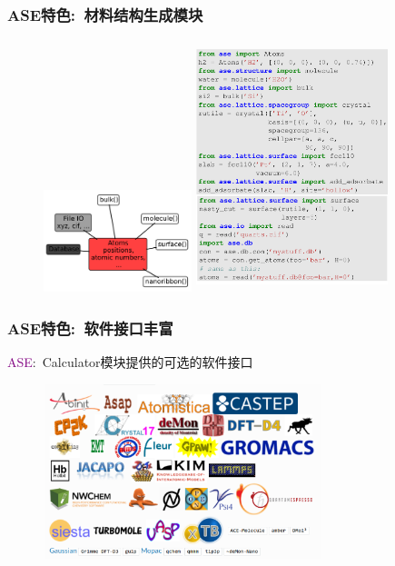 \frame
{
\frametitle{\textrm{ASE}特色:~材料结构生成模块}
\begin{figure}[h!]
\centering
\vspace*{-0.15in}
\includegraphics[height=1.2in,width=1.7in,viewport=0 0 820 530,clip]{Figures/ASE_atoms_module.png}
\includegraphics[height=2.9in,width=2.2in,viewport=0 0 970 1200,clip]{Figures/ASE_atoms_module-examples.png}
\label{Logo_atoms-module}
\end{figure} 
}

\frame
{
\frametitle{\textrm{ASE}特色:~软件接口丰富}
\textcolor{purple}{\textrm{ASE}}:~\textrm{Calculator}模块提供的可选的软件接口
\begin{figure}[h!]
\centering
\vspace*{-0.05in}
\includegraphics[height=2.0in,width=3.2in,viewport=0 0 940 600,clip]{Figures/ASE_calculator-new.png}
\caption{\fontsize{7.2pt}{4.2pt}}%
\label{ASE_Calculator}
\end{figure} 
}

